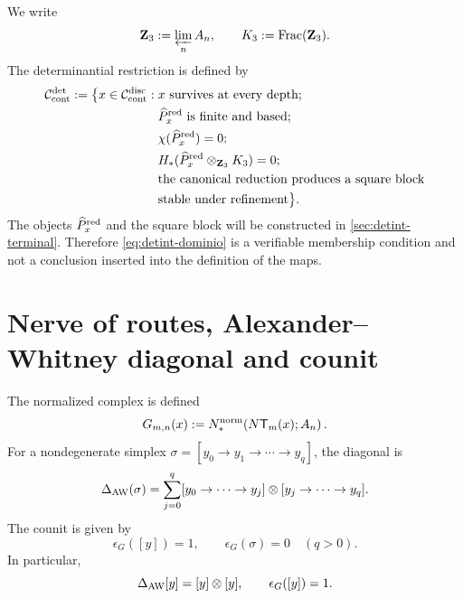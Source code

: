We write
\begin{equation}\label{eq:detint-z3-k3}
 \mathbf Z_3:=\varprojlim_n A_n,
 \qquad
 K_3:=\operatorname{Frac}(\mathbf Z_3).
\end{equation}
The determinantial restriction is defined by
\begin{equation}\label{eq:detint-dominio}
\begin{split}
 \mathcal C_{\rm cont}^{\rm det}:=
 \bigl\{x\in\mathcal C_{\rm cont}^{\rm disc}:{}&
 x\text{ survives at every depth};\\
 &\widehat P_x^{\rm red}\text{ is finite and based};\\
 &\chi(\widehat P_x^{\rm red})=0;\\
 &H_*(\widehat P_x^{\rm red}\otimes_{\mathbf Z_3}K_3)=0;\\
 &\text{the canonical reduction produces a square block}\\
 &\text{stable under refinement}\bigr\}.
\end{split}
\end{equation}
The objects \(\widehat P_x^{\rm red}\) and the square block will be constructed
in \cref{sec:detint-terminal}. Therefore
\eqref{eq:detint-dominio} is a verifiable membership condition and not
a conclusion inserted into the definition of the maps.

\fi
\section{Nerve of routes, Alexander--Whitney diagonal and counit}

The normalized complex is defined
\begin{equation}\label{eq:detint-gmn}
 G_{m,n}(x):=
 N_*^{\rm norm}\!\left(N\mathsf T_m(x);A_n\right).
\end{equation}
For a nondegenerate simplex
\(\sigma=[y_0\to y_1\to\cdots\to y_q]\), the diagonal is
\begin{equation}\label{eq:detint-aw}
 \Delta_{\rm AW}(\sigma)
 =\sum_{j=0}^q
 [y_0\to\cdots\to y_j]\otimes
 [y_j\to\cdots\to y_q].
\end{equation}
The counit is given by
\begin{equation}\label{eq:detint-counidad-g}
 \epsilon_G([y])=1,
 \qquad
 \epsilon_G(\sigma)=0\quad(q>0).
\end{equation}
In particular,
\begin{equation}\label{eq:detint-vertice-grouplike}
 \Delta_{\rm AW}[y]=[y]\otimes[y],
 \qquad
 \epsilon_G([y])=1.
\end{equation}

